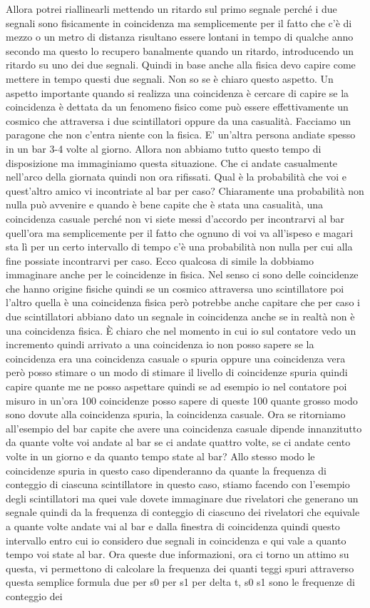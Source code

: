 Allora potrei riallinearli mettendo un ritardo sul primo segnale perché i due segnali sono fisicamente in coincidenza ma semplicemente per il fatto che c'è di mezzo o un metro di distanza risultano essere lontani in tempo di qualche anno secondo ma questo lo recupero banalmente quando un ritardo, introducendo un ritardo su uno dei due segnali. Quindi in base anche alla fisica devo capire come mettere in tempo questi due segnali. Non so se è chiaro questo aspetto. Un aspetto importante quando si realizza una coincidenza è cercare di capire se la coincidenza è dettata da un fenomeno fisico come può essere effettivamente un cosmico che attraversa i due scintillatori oppure da una casualità. Facciamo un paragone che non c'entra niente con la fisica. E' un'altra persona andiate spesso in un bar 3-4 volte al giorno. Allora non abbiamo tutto questo tempo di disposizione ma immaginiamo questa situazione. Che ci andate casualmente nell'arco della giornata quindi non ora rifissati. Qual è la probabilità che voi e quest'altro amico vi incontriate al bar per caso? Chiaramente una probabilità non nulla può avvenire e quando è bene capite che è stata una casualità, una coincidenza casuale perché non vi siete messi d'accordo per incontrarvi al bar quell'ora ma semplicemente per il fatto che ognuno di voi va all'ispeso e magari sta lì per un certo intervallo di tempo c'è una probabilità non nulla per cui alla fine possiate incontrarvi per caso. Ecco qualcosa di simile la dobbiamo immaginare anche per le coincidenze in fisica. Nel senso ci sono delle coincidenze che hanno origine fisiche quindi se un cosmico attraversa uno scintillatore poi l'altro quella è una coincidenza fisica però potrebbe anche capitare che per caso i due scintillatori abbiano dato un segnale in coincidenza anche se in realtà non è una coincidenza fisica. È chiaro che nel momento in cui io sul contatore vedo un incremento quindi arrivato a una coincidenza io non posso sapere se la coincidenza era una coincidenza casuale o spuria oppure una coincidenza vera però posso stimare o un modo di stimare il livello di coincidenze spuria quindi capire quante me ne posso aspettare quindi se ad esempio io nel contatore poi misuro in un'ora 100 coincidenze posso sapere di queste 100 quante grosso modo sono dovute alla coincidenza spuria, la coincidenza casuale. Ora se ritorniamo all'esempio del bar capite che avere una coincidenza casuale dipende innanzitutto da quante volte voi andate al bar se ci andate quattro volte, se ci andate cento volte in un giorno e da quanto tempo state al bar? Allo stesso modo le coincidenze spuria in questo caso dipenderanno da quante la frequenza di conteggio di ciascuna scintillatore in questo caso, stiamo facendo con l'esempio degli scintillatori ma quei vale dovete immaginare due rivelatori che generano un segnale quindi da la frequenza di conteggio di ciascuno dei rivelatori che equivale a quante volte andate vai al bar e dalla finestra di coincidenza quindi questo intervallo entro cui io considero due segnali in coincidenza e qui vale a quanto tempo voi state al bar. Ora queste due informazioni, ora ci torno un attimo su questa, vi permettono di calcolare la frequenza dei quanti teggi spuri attraverso questa semplice formula due per s0 per s1 per delta t, s0 s1 sono le frequenze di conteggio dei 